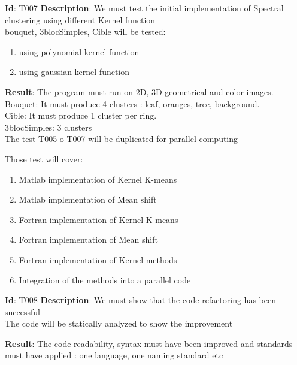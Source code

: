 \textbf{Id}: T007
\textbf{Description}: We must test the initial implementation of Spectral clustering using different Kernel function \\
bouquet, 3blocSimples, Cible will be tested: 
\begin{enumerate}
\item using polynomial kernel function
\item using gaussian kernel function
\end{enumerate}
\textbf{Result}: The program must run on 2D, 3D geometrical and color images. \\
Bouquet: It must produce 4 clusters : leaf, oranges, tree, background.\\
Cible: It must produce 1 cluster per ring.\\
3blocSimples: 3 clusters\\

The test T005 o T007 will be duplicated for parallel computing

Those test will cover:
\begin{enumerate}
\item Matlab implementation of Kernel K-means
\item Matlab implementation of Mean shift
\item Fortran implementation of Kernel K-means
\item Fortran implementation of Mean shift
\item Fortran implementation of Kernel methods
\item Integration of the methods into a parallel code
\end{enumerate}


\textbf{Id}: T008
\textbf{Description}: We must show that the code refactoring has been successful \\
The code will be statically analyzed to show the improvement 

\textbf{Result}: The code readability, syntax must have been improved and standards must have applied : one language, one naming standard etc\\
